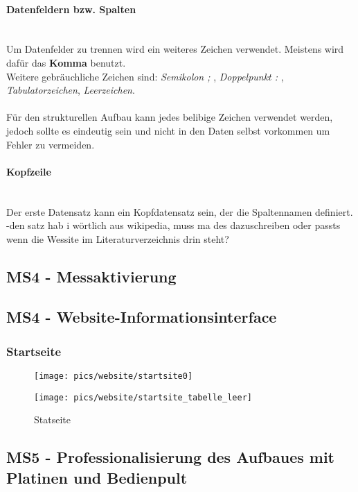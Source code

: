 \documentclass[12pt,a4paper]{article}
\begin{document}
\paragraph{Datenfeldern bzw. Spalten}\mbox{}\\
Um Datenfelder  zu trennen wird ein weiteres Zeichen verwendet. Meistens wird dafür das {\bf Komma} benutzt. \\
Weitere gebräuchliche Zeichen sind: {\it Semikolon ; }, {\it Doppelpunkt : }, {\it Tabulatorzeichen}, {\it Leerzeichen}. \\\\
%
Für den strukturellen Aufbau kann jedes belibige Zeichen verwendet werden, 
jedoch sollte es eindeutig sein und nicht in den Daten selbst vorkommen um Fehler zu vermeiden. 
%
\paragraph{Kopfzeile}\mbox{}\\
Der erste Datensatz kann ein Kopfdatensatz sein, der die Spaltennamen definiert. {\color{red}-den satz hab i wörtlich aus wikipedia, muss ma des dazuschreiben oder passts wenn die Wessite im Literaturverzeichnis drin steht?}


%
%
\newpage
\subsection{MS4 - Messaktivierung}
\subsection{MS4 - Website-Informationsinterface}
%
\subsubsection*{Startseite}
\begin{figure}[h!]
\centering
\texttt{[image: pics/website/startsite0]}
\end{figure}
%
\begin{figure}[h!]
\centering
\texttt{[image: pics/website/startsite\_tabelle\_leer]}
\caption{Statseite}
\end{figure}
%
%
\newpage
\subsection{MS5 - Professionalisierung des Aufbaues mit Platinen und Bedienpult }
\end{document}

